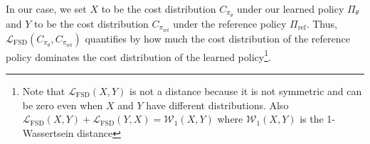 In our case, we set $X$ to be the cost distribution $C_{\pi_{\theta}}$ under our learned policy $\Pi_{\theta}$ and $Y$ to be the cost distribution $C_{\pi_{\mathrm{ref}}}$ under the reference policy $\Pi_{\mathrm{ref}}$. Thus, $\mathcal{L}_{\mathrm{FSD}}(C_{\pi_{\theta}},C_{\pi_{\mathrm{ref}}})$ quantifies by how much the cost distribution of the reference policy dominates the cost distribution of the learned policy\footnote{Note that $\mathcal{L}_{\mathrm{FSD}}(X,Y)$ is not a distance because it is not symmetric and can be zero even when $X$ and $Y$ have different distributions. Also $\mathcal{L}_\mathrm{FSD}(X,Y) + \mathcal{L}_\mathrm{FSD}(Y,X) = \mathcal{W}_{1}(X,Y)$ where $\mathcal{W}_{1}(X,Y)$ is the 1-Wassertsein distance }.




